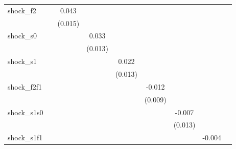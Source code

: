 {\begin{tabular}{l*{8}{c}}
\addlinespace
shock\_f2    &                     &       0.043\sym{***}&                     &                     &                     &                     &                     &                     \\
            &                     &     (0.015)         &                     &                     &                     &                     &                     &                     \\
\addlinespace
shock\_s0    &                     &                     &       0.033\sym{**} &                     &                     &                     &                     &                     \\
            &                     &                     &     (0.013)         &                     &                     &                     &                     &                     \\
\addlinespace
shock\_s1    &                     &                     &                     &       0.022         &                     &                     &                     &                     \\
            &                     &                     &                     &     (0.013)         &                     &                     &                     &                     \\
\addlinespace
shock\_f2f1  &                     &                     &                     &                     &      -0.012         &                     &                     &                     \\
            &                     &                     &                     &                     &     (0.009)         &                     &                     &                     \\
\addlinespace
shock\_s1s0  &                     &                     &                     &                     &                     &      -0.007         &                     &                     \\
            &                     &                     &                     &                     &                     &     (0.013)         &                     &                     \\
\addlinespace
shock\_s1f1  &                     &                     &                     &                     &                     &                     &      -0.004         &                     \\

\end{tabular}}
